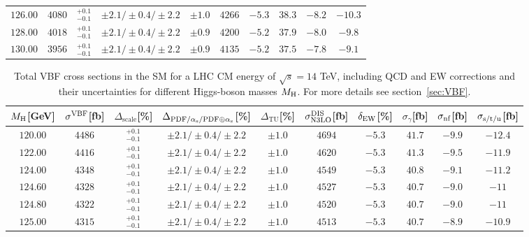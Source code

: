 \begin{table}[ht!]
\begin{center}
\begin{small}
\begin{tabular}{cccccccc|cc}
$126.00$ & $4080$ & $^{+0.1}_{-0.1}$ & $\pm 2.1/\pm 0.4/\pm 2.2$ & $\pm 1.0$ & $4266$ & $-5.3$ & $38.3$ & $-8.2$ & $-10.3$ \\
$128.00$ & $4018$ & $^{+0.1}_{-0.1}$ & $\pm 2.1/\pm 0.4/\pm 2.2$ & $\pm 0.9$ & $4200$ & $-5.2$ & $37.9$ & $-8.0$ & $-9.8 $ \\
$130.00$ & $3956$ & $^{+0.1}_{-0.1}$ & $\pm 2.1/\pm 0.4/\pm 2.2$ & $\pm 0.9$ & $4135$ & $-5.2$ & $37.5$ & $-7.8$ & $-9.1 $ \\
\bottomrule
\end{tabular}%
\end{small}%
\end{center}%
\end{table}

\begin{table}[ht!]
\caption{Total VBF cross sections in the SM for a LHC CM energy of $\sqrt{s}=14$ TeV, including QCD and EW corrections
and their uncertainties for different Higgs-boson masses $M_\mathrm{H}$. For more details see section~\ref{sec:VBF}.}
\label{tab:vbf_XStot_14}
\begin{center}%
\begin{small}%
\begin{tabular}{cccccccc|cc}%
\toprule
$M_\mathrm{H}$[GeV] & $\sigma^{\mathrm{VBF}}$[fb] & $\Delta_{\mathrm{scale}}$[\%] & $\Delta_{\mathrm{PDF}/\alpha_{\mathrm{s}}/\mathrm{PDF\oplus\alpha_{\mathrm{s}}}}$[\%] & $\Delta_{\mathrm{TU}}$[\%] &
$\sigma_{\mathrm{N3LO}}^{\mathrm{DIS}}$[fb] & $\delta_{\mathrm{EW}}$[\%] & $\sigma_{\gamma}$[fb] & $\sigma_{\mbox{\scriptsize nf}}$[fb] & $\sigma_{\mbox{\scriptsize s/t/u}}$[fb]
\\
\midrule
$120.00$ & $4486$ & $^{+0.1}_{-0.1}$ & $\pm 2.1/\pm 0.4/\pm 2.2$ & $\pm 1.0$ & $4694$ & $-5.3$ & $41.7$ & $-9.9$ & $-12.4$ \\
$122.00$ & $4416$ & $^{+0.1}_{-0.1}$ & $\pm 2.1/\pm 0.4/\pm 2.2$ & $\pm 1.0$ & $4620$ & $-5.3$ & $41.3$ & $-9.5$ & $-11.9$ \\
$124.00$ & $4348$ & $^{+0.1}_{-0.1}$ & $\pm 2.1/\pm 0.4/\pm 2.2$ & $\pm 1.0$ & $4549$ & $-5.3$ & $40.8$ & $-9.1$ & $-11.2$ \\
$124.60$ & $4328$ & $^{+0.1}_{-0.1}$ & $\pm 2.1/\pm 0.4/\pm 2.2$ & $\pm 1.0$ & $4527$ & $-5.3$ & $40.7$ & $-9.0$ & $-11  $ \\
$124.80$ & $4322$ & $^{+0.1}_{-0.1}$ & $\pm 2.1/\pm 0.4/\pm 2.2$ & $\pm 1.0$ & $4520$ & $-5.3$ & $40.7$ & $-9.0$ & $-11  $ \\
$125.00$ & $4315$ & $^{+0.1}_{-0.1}$ & $\pm 2.1/\pm 0.4/\pm 2.2$ & $\pm 1.0$ & $4513$ & $-5.3$ & $40.7$ & $-8.9$ & $-10.9$ \\

\end{tabular}
\end{small}
\end{center}
\end{table}
